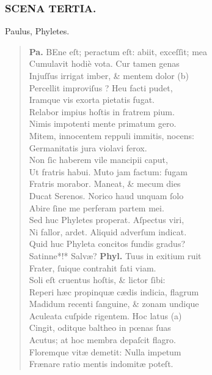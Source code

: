 \documentclass[a4paper,12pt]{article}
\begin{document}
\subsubsection{SCENA TERTIA.}
\label{sec:org983a6e6}
Paulus, Phyletes.
\begin{verse}
\textbf{Pa.} BEne eſt; peractum eſt: abiit, exceſſit; mea\\[0pt]
Cumulavit hodiè vota. Cur tamen genas\\[0pt]
Injuſſus irrigat imber, \& mentem dolor (b)\footnotemark\\[0pt]
Percellit improviſus ? Heu facti pudet,\\[0pt]
Iramque vis exorta pietatis fugat.\\[0pt]
Relabor impius hoſtis in fratrem pium.\\[0pt]
Nimis impotenti mente primatum gero.\\[0pt]
Mitem, innocentem reppuli immitis, nocens:\\[0pt]
Germanitatis jura violavi ferox.\\[0pt]
Non ſic haberem vile mancipii caput,\\[0pt]
Ut fratris habui. Muto jam factum: fugam\\[0pt]
Fratris morabor. Maneat, \& mecum dies\\[0pt]
Ducat Serenos. Norico haud unquam ſolo\\[0pt]
Abire ſine me perferam partem mei.\\[0pt]
Sed huc Phyletes properat. Aſpectus viri,\\[0pt]
Ni fallor, ardet. Aliquid adverſum indicat.\\[0pt]
Quid huc Phyleta concitos fundis gradus?\\[0pt]
Satinne*!* Salvæ? \textbf{Phyl.} Tuus in exitium ruit\\[0pt]
Frater, ſuique contrahit fati viam.\\[0pt]
Soli eſt cruentus hoſtis, \& lictor ſibi:\\[0pt]
Reperi hæc propinquæ cædis indicia, flagrum\\[0pt]
Madidum recenti ſanguine, \& zonam undique\\[0pt]
Aculeata cuſpide rigentem. Hoc latus (a)\footnotemark\\[0pt]
Cingit, oditque baltheo in pœnas ſuas\\[0pt]
Acutus; at hoc membra depaſcit flagro.\\[0pt]
Floremque vitæ demetit: Nulla impetum\\[0pt]
Frænare ratio mentis indomitæ poteſt.\\[0pt]

\end{verse}
\end{document}
